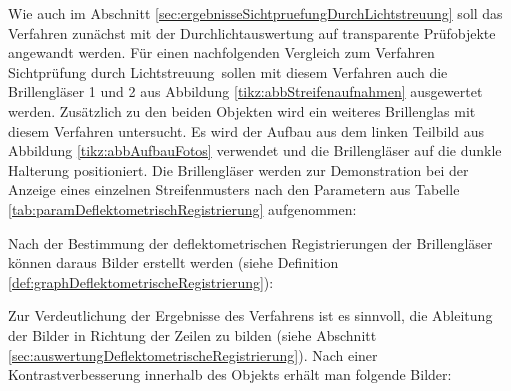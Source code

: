Wie auch im Abschnitt \ref{sec:ergebnisseSichtpruefungDurchLichtstreuung} soll das Verfahren zunächst mit der Durchlichtauswertung auf transparente Prüfobjekte angewandt werden.
Für einen nachfolgenden Vergleich zum Verfahren \glqq Sichtprüfung durch Lichtstreuung\grqq ~sollen mit diesem Verfahren auch die Brillengläser 1 und 2 aus Abbildung \ref{tikz:abbStreifenaufnahmen} ausgewertet werden.
Zusätzlich zu den beiden Objekten wird ein weiteres Brillenglas mit diesem Verfahren untersucht.
Es wird der Aufbau aus dem linken Teilbild aus Abbildung \ref{tikz:abbAufbauFotos} verwendet und die Brillengläser auf die dunkle Halterung positioniert.
Die Brillengläser werden zur Demonstration bei der Anzeige eines einzelnen Streifenmusters nach den Parametern aus Tabelle \ref{tab:paramDeflektometrischRegistrierung} aufgenommen:

{
	\begin{figure}[H]
		\centering
		
		\label{tikz:abbSinusStreifenaufnahmen}
	\end{figure}
}

\noindent
Nach der Bestimmung der deflektometrischen Registrierungen der Brillengläser können daraus Bilder erstellt werden (siehe Definition \ref{def:graphDeflektometrischeRegistrierung}):

{
	\begin{figure}[H]
		
		\label{tikz:abbDeflectometricRegistrations}
	\end{figure}
}

\noindent
Zur Verdeutlichung der Ergebnisse des Verfahrens ist es sinnvoll, die Ableitung der Bilder in Richtung der Zeilen zu bilden (siehe Abschnitt \ref{sec:auswertungDeflektometrischeRegistrierung}).
Nach einer Kontrastverbesserung innerhalb des Objekts erhält man folgende Bilder:

{
	\begin{figure}[H]
		\centering
		
		\label{tikz:abbAbleitungRegistrierungDurchlicht}
	\end{figure}
}

